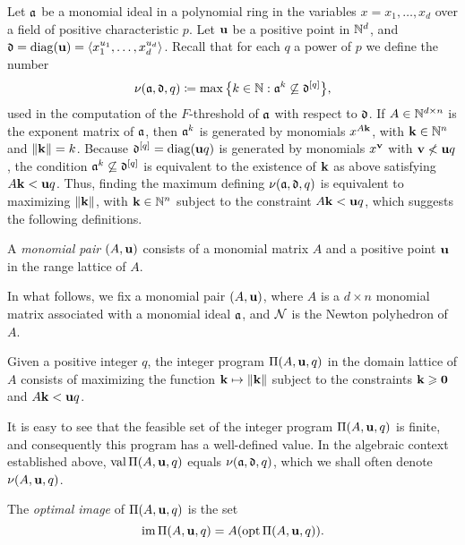 \documentclass[11pt]{amsart}
\begin{document}
Let $\mathfrak{a}$ be a monomial ideal in a polynomial ring in the variables $x=x_1,\ldots,x_d$ over a field of positive characteristic $p$.
Let $\mathbf{u}$ be a positive point in $\mathbb{N}^d$, and $\mathfrak{d} = \operatorname{diag}(\mathbf{u}) = \langle x_1^{u_1},\ldots,x_d^{u_d} \rangle$.
Recall that for each $q$ a power of $p$ we define the number
\[\nu(\mathfrak{a},\mathfrak{d},q) \coloneqq \max\big\{k\in \mathbb{N} : \mathfrak{a}^{k} \not\subseteq \mathfrak{d}^{[q]}\big\},\]
used in the computation of the $F$-threshold of $\mathfrak{a}$ with respect to $\mathfrak{d}$.
If $A \in \mathbb{N}^{d\times n}$ is the exponent matrix of $\mathfrak{a}$, then $\mathfrak{a}^k$ is generated by monomials $x^{A\mathbf{k}}$, with $\mathbf{k}\in \mathbb{N}^n$ and $\| \mathbf{k} \| = k$.
Because $\mathfrak{d}^{[q]} = \operatorname{diag}(\mathbf{u}q)$ is generated by monomials $x^{\mathbf{v}}$ with $\mathbf{v} \not< \mathbf{u}q$, the condition $\mathfrak{a}^{k} \not\subseteq \mathfrak{d}^{[q]}$ is equivalent to the existence of $\mathbf{k}$ as above satisfying $A\mathbf{k} < \mathbf{u}q$.
Thus, finding the maximum defining $\nu(\mathfrak{a},\mathfrak{d},q)$ is equivalent to maximizing $\| \mathbf{k} \|$, with $\mathbf{k} \in \mathbb{N}^n$ subject to the constraint $A\mathbf{k} < \mathbf{u}q$, which suggests the following definitions.

\begin{definition}
   A \emph{monomial pair} $(A, \mathbf{u})$ consists of a monomial matrix $A$ and a positive point $\mathbf{u}$ in the range lattice of $A$.
\end{definition}

In what follows, we fix a monomial pair $(A,\mathbf{u})$, where $A$ is a $d\times n$ monomial matrix associated with a monomial ideal $\mathfrak{a}$, and $\mathcal{N}$ is the Newton polyhedron of $A$.

\begin{definition}
   Given a positive integer $q$, the integer program $\Pi(A, \mathbf{u}, q)$ in the domain lattice of $A$ consists of maximizing the function $\mathbf{k} \mapsto \| \mathbf{k} \|$ subject to the constraints $\mathbf{k} \geqslant \mathbf{0}$ and $A \mathbf{k} < \mathbf{u}q$. 
\end{definition}

It is easy  to see that the feasible set of the integer program $\Pi(A,\mathbf{u},q)$ is finite, and consequently this program has a well-defined value.
In the algebraic context established above, $\operatorname{val} \Pi(A,\mathbf{u},q)$ equals $\nu(\mathfrak{a},\mathfrak{d},q)$, which we shall often denote $\nu(A,\mathbf{u},q)$.

\begin{definition}
   The \emph{optimal image} of $\Pi(A, \mathbf{u}, q)$ is the set \[ \operatorname{im} \Pi(A, \mathbf{u}, q) = A ( \operatorname{opt} \Pi(A, \mathbf{u}, q) ). \] 
\end{definition}
\end{document}
